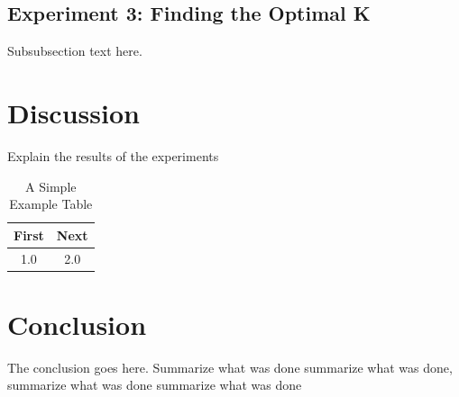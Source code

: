 \documentclass[conference]{IEEEtran}
\begin{document}
\subsection{Experiment 3: Finding the Optimal K}
Subsubsection text here.

\section{Discussion}
Explain the results of the experiments

\begin{table}[!t]
\renewcommand{\arraystretch}{1.3}
\caption{A Simple Example Table}
\label{table_example}
\centering
\begin{tabular}{c||c}
\hline
\bfseries First & \bfseries Next\\
\hline\hline
1.0 & 2.0\\
\hline
\end{tabular}
\end{table}

\section{Conclusion}
The conclusion goes here.  Summarize what was done summarize what was done, summarize what was done summarize what was done




\end{document}

